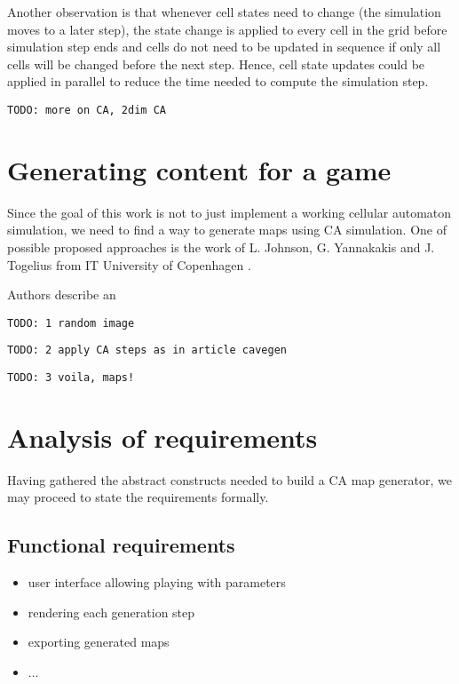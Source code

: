 \documentclass[12pt]{report}
\newcommand{\todo}[1]{}
\renewcommand{\todo}[1]{{\color{red} \par \noindent \footnotesize \texttt{TODO: {#1} }}}
\begin{document}
Another observation is that whenever cell states need to change (the simulation moves to a later step), the state change is applied to every cell in the grid before simulation step ends and cells do not need to be updated in sequence if only all cells will be changed before the next step. Hence, cell state updates could be applied in parallel to reduce the time needed to compute the simulation step.

\todo{more on CA, 2dim CA}


 







\section{Generating content for a game}

Since the goal of this work is not to just implement a working cellular automaton simulation, we need to find a way to generate maps using CA simulation. One of possible proposed approaches is the work of L. Johnson, G. Yannakakis and J. Togelius from IT University of Copenhagen \autocite{johnson2010cellular}. 

Authors describe an 


\todo{1 random image}
\todo{2 apply CA steps as in article cavegen}
\todo{3 voila, maps!}



\section{Analysis of requirements}

Having gathered the abstract constructs needed to build a CA map generator, we may proceed to state the requirements formally.

\subsection{Functional requirements}

\begin{itemize}
	\item user interface allowing playing with parameters
	\item rendering each generation step
	\item exporting generated maps
	\item ...
\end{itemize}
\end{document}
